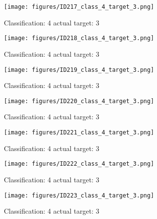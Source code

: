 \begin{figure}[h!]
\begin{center}
\texttt{[image: figures/ID217\_class\_4\_target\_3.png]}
\end{center}
\caption{ Classification: 4 actual target: 3}
\label{fig:ID217_class_4_target_3}
\end{figure}
\begin{figure}[h!]
\begin{center}
\texttt{[image: figures/ID218\_class\_4\_target\_3.png]}
\end{center}
\caption{ Classification: 4 actual target: 3}
\label{fig:ID218_class_4_target_3}
\end{figure}
\begin{figure}[h!]
\begin{center}
\texttt{[image: figures/ID219\_class\_4\_target\_3.png]}
\end{center}
\caption{ Classification: 4 actual target: 3}
\label{fig:ID219_class_4_target_3}
\end{figure}
\begin{figure}[h!]
\begin{center}
\texttt{[image: figures/ID220\_class\_4\_target\_3.png]}
\end{center}
\caption{ Classification: 4 actual target: 3}
\label{fig:ID220_class_4_target_3}
\end{figure}
\begin{figure}[h!]
\begin{center}
\texttt{[image: figures/ID221\_class\_4\_target\_3.png]}
\end{center}
\caption{ Classification: 4 actual target: 3}
\label{fig:ID221_class_4_target_3}
\end{figure}
\begin{figure}[h!]
\begin{center}
\texttt{[image: figures/ID222\_class\_4\_target\_3.png]}
\end{center}
\caption{ Classification: 4 actual target: 3}
\label{fig:ID222_class_4_target_3}
\end{figure}
\begin{figure}[h!]
\begin{center}
\texttt{[image: figures/ID223\_class\_4\_target\_3.png]}
\end{center}
\caption{ Classification: 4 actual target: 3}
\label{fig:ID223_class_4_target_3}
\end{figure}
